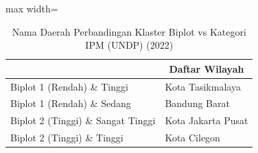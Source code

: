 \begin{table}[H]
\centering
\caption{Nama Daerah Perbandingan Klaster Biplot vs Kategori IPM (UNDP) (2022)} \label{tab:sample2crossname2022}
\begin{adjustbox}{max width=\textwidth}
\begin{tabular}{|>{\centering\arraybackslash}p{4cm}|p{10cm}|}
\hline
\multicolumn{1}{|c|}{\textbf{Kategori}} & \multicolumn{1}{c|}{\textbf{Daftar Wilayah}} \\
\hline
Biplot 1 (Rendah) \& Tinggi & Kota Tasikmalaya \\
\hline
Biplot 1 (Rendah) \& Sedang & Bandung Barat \\
\hline
Biplot 2 (Tinggi) \& Sangat Tinggi & Kota Jakarta Pusat \\
\hline
Biplot 2 (Tinggi) \& Tinggi & Kota Cilegon \\
\hline
\end{tabular}
\end{adjustbox}
\end{table}